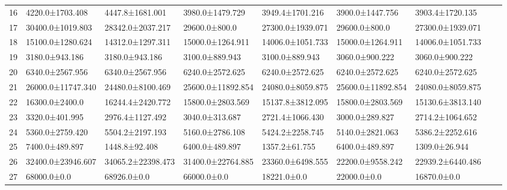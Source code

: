 \begin{tabular}{|r|l|l|l|l|l|l|l|l|}
  16 & 4220.0±1703.408 & 4447.8±1681.001 & 3980.0±1479.729 & 3949.4±1701.216 & 3900.0±1447.756 & 3903.4±1720.135 \\ 
  17 & 30400.0±1019.803 & 28342.0±2037.217 & 29600.0±800.0 & 27300.0±1939.071 & 29600.0±800.0 & 27300.0±1939.071 \\ 
  18 & 15100.0±1280.624 & 14312.0±1297.311 & 15000.0±1264.911 & 14006.0±1051.733 & 15000.0±1264.911 & 14006.0±1051.733 \\ 
  19 & 3180.0±943.186 & 3180.0±943.186 & 3100.0±889.943 & 3100.0±889.943 & 3060.0±900.222 & 3060.0±900.222 \\ 
  20 & 6340.0±2567.956 & 6340.0±2567.956 & 6240.0±2572.625 & 6240.0±2572.625 & 6240.0±2572.625 & 6240.0±2572.625 \\ 
  21 & 26000.0±11747.340 & 24480.0±8100.469 & 25600.0±11892.854 & 24080.0±8059.875 & 25600.0±11892.854 & 24080.0±8059.875 \\ 
  22 & 16300.0±2400.0 & 16244.4±2420.772 & 15800.0±2803.569 & 15137.8±3812.095 & 15800.0±2803.569 & 15130.6±3813.140 \\ 
  23 & 3320.0±401.995 & 2976.4±1127.492 & 3040.0±313.687 & 2721.4±1066.430 & 3000.0±289.827 & 2714.2±1064.652 \\ 
  24 & 5360.0±2759.420 & 5504.2±2197.193 & 5160.0±2786.108 & 5424.2±2258.745 & 5140.0±2821.063 & 5386.2±2252.616 \\ 
  25 & 7400.0±489.897 & 1448.8±92.408 & 6400.0±489.897 & 1357.2±61.755 & 6400.0±489.897 & 1309.0±26.944 \\ 
  26 & 32400.0±23946.607 & 34065.2±22398.473 & 31400.0±22764.885 & 23360.0±6498.555 & 22200.0±9558.242 & 22939.2±6440.486 \\ 
  27 & 68000.0±0.0 & 68926.0±0.0 & 66000.0±0.0 & 18221.0±0.0 & 22000.0±0.0 & 16870.0±0.0 \\ 
\end{tabular}
